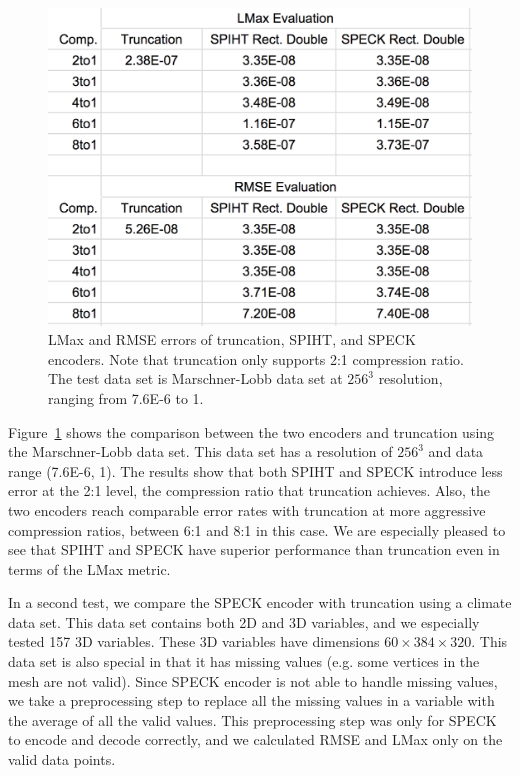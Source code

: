 \documentclass[review]{vgtc}                 %
\begin{document}
\begin{figure}
  \centering
    \includegraphics[width=0.9\columnwidth]{figs/truncation_fig3.png}
  \caption{
LMax and RMSE errors of truncation, SPIHT, and SPECK encoders.
%
Note that truncation only supports 2:1 compression ratio.
%
The test data set is Marschner-Lobb data set at $256^3$ resolution,
ranging from 7.6E-6 to 1.
}
  \label{fig:truncation_fig3}
\end{figure}


Figure~\ref{fig:truncation_fig3} shows the comparison between the two encoders 
and truncation using the Marschner-Lobb data set.
%
This data set has a resolution of $256^3$ and data range (7.6E-6, 1).
%
The results show that both SPIHT and SPECK introduce less error at the 2:1 level, 
the compression ratio that truncation achieves.
%
Also, the two encoders reach comparable error rates with truncation
at more aggressive compression ratios, between 6:1 and 8:1 in this case.
%
We are especially pleased to see that SPIHT and SPECK have superior performance
than truncation even in terms of the LMax metric.


In a second test, we compare the SPECK encoder with truncation using
a climate data set.
%
This data set contains both 2D and 3D variables, and we especially tested
157 3D variables.
%
These 3D variables have dimensions $60\times384\times320$.
%
This data set is also special in that it has missing values
(e.g. some vertices in the mesh are not valid).
%
Since SPECK encoder is not able to handle missing values,
we take a preprocessing step to replace all the missing values in a variable 
with the average of all the valid values.
%
This preprocessing step was only for SPECK to encode and decode correctly, 
and we calculated RMSE and LMax only on the valid data points.
\end{document}
